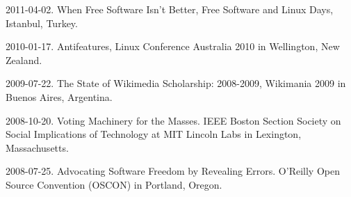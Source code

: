 \documentclass[11pt]{article}
\newenvironment{cvlist}{
\begin{list}{}{\leftmargin=3.0em \itemindent=-3.0em}
  \setlength{\itemsep}{0pt}
  \setlength{\parskip}{0em}
  \setlength{\parsep}{1em}
  \setlength{\parindent}{0em}}
{\vspace{1em}
\end{list}}
\begin{document}
\begin{cvlist}
\item 2011-04-02. When Free Software Isn't Better, Free Software and Linux Days, Istanbul, Turkey.
\item 2010-01-17. Antifeatures, Linux Conference Australia 2010 in Wellington, New Zealand. %
\item 2009-07-22. The State of Wikimedia Scholarship: 2008-2009, Wikimania 2009 in Buenos Aires, Argentina.
\item 2008-10-20. Voting Machinery for the Masses. IEEE Boston Section Society on Social Implications of Technology at MIT Lincoln Labs in Lexington, Massachusetts.
\item 2008-07-25. Advocating Software Freedom by Revealing Errors. O'Reilly Open Source Convention (OSCON) in Portland, Oregon. %

\end{cvlist}
\end{document}
